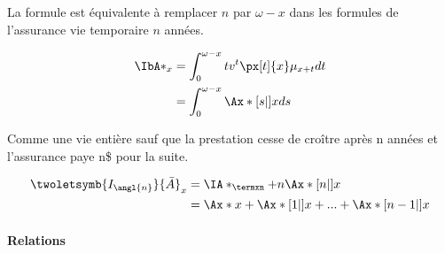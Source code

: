 \documentclass[10pt, french]{article}
\begin{document}
\begin{multicols*}{3}
\begin{definitionNOHFILLprop}
La formule est équivalente à remplacer $n$ par $\omega - x$ dans les formules de l'assurance vie temporaire $n$ années.

\begin{align*}
	\IbA*_x &= \int_0^{\omega - x} t v^t \px[t]{x} \mu_{x+t} dt \\
		&= \int_0^{\omega - x} \Ax*[s|]{x} ds 
\end{align*}
\end{definitionNOHFILLprop}


\begin{definitionNOHFILLprop}
Comme une vie entière sauf que la prestation cesse de croître après n années et l'assurance paye n\$ pour la suite.

\begin{align*}
	\twoletsymb{I_{\angl{n}}}{\bar{A}}_{x} 
	&=	\IA*_{\termxn} + n \Ax*[n|]{x}\\
	&=	\Ax*{x} + \Ax*[1|]{x} + ... + \Ax*[n-1|]{x}
\end{align*}
\end{definitionNOHFILLprop}


\paragraph{Relations} 


\end{multicols*}
\end{document}
